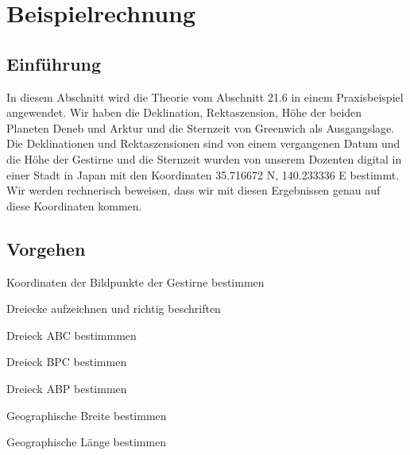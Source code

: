 \section{Beispielrechnung}

\subsection{Einführung}
In diesem Abschnitt wird die Theorie vom Abschnitt 21.6 in einem Praxisbeispiel angewendet. 
Wir haben die Deklination, Rektaszension, Höhe der beiden Planeten Deneb und Arktur und die Sternzeit von Greenwich als Ausgangslage.
Die Deklinationen und Rektaszensionen sind von einem vergangenen Datum und die Höhe der Gestirne und die Sternzeit wurden von unserem Dozenten digital in einer Stadt in Japan mit den Koordinaten 35.716672 N, 140.233336 E bestimmt.
Wir werden rechnerisch beweisen, dass wir mit diesen Ergebnissen genau auf diese Koordinaten kommen.
\subsection{Vorgehen}

\begin{compactenum}
\item
Koordinaten der Bildpunkte der Gestirne bestimmen 
\item
Dreiecke aufzeichnen und richtig beschriften
\item
Dreieck ABC bestimmmen
\item
Dreieck BPC bestimmen 
\item
Dreieck ABP bestimmen 
\item
Geographische Breite bestimmen
\item
Geographische Länge bestimmen
\end{compactenum}

